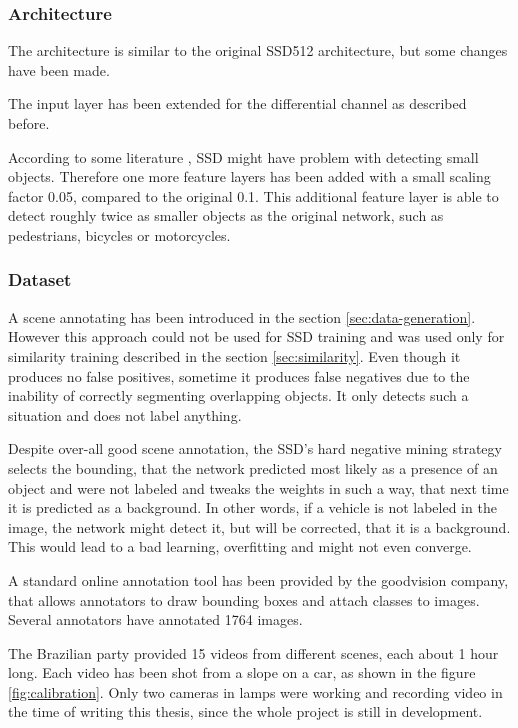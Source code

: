 \documentclass[a4paper,12pt,titlepage, twoside]{article}
\numberwithin{figure}{section}
\begin{document}
\subsubsection{Architecture}
The architecture is similar to the original SSD512 architecture, but some changes have been made. 

The input layer has been extended for the differential channel as described before. 

According to some literature \cite{cao2018feature}, SSD might have problem with detecting small objects. Therefore one more feature layers has been added with a small scaling factor 0.05, compared to the original 0.1. This additional feature layer is able to detect roughly twice as smaller objects as the original network, such as pedestrians, bicycles or motorcycles.

\subsubsection{Dataset}
A scene annotating has been introduced in the section \ref{sec:data-generation}. However this approach could not be used for SSD training and was used only for similarity training described in the section \ref{sec:similarity}. Even though it produces no false positives, sometime it produces false negatives due to the inability of correctly segmenting overlapping objects. It only detects such a situation and does not label anything.

Despite over-all good scene annotation, the SSD's hard negative mining strategy selects the bounding, that the network predicted most likely as a presence of an object and were not labeled and tweaks the weights in such a way, that next time it is predicted as a background. In other words, if a vehicle is not labeled in the image, the network might detect it, but will be corrected, that it is a background. This would lead to a bad learning, overfitting and might not even converge.

A standard online annotation tool has been provided by the goodvision company, that allows annotators to draw bounding boxes and attach classes to images. Several annotators have annotated 1764 images.

The Brazilian party provided 15 videos from different scenes, each about 1 hour long. Each video has been shot from a slope on a car, as shown in the figure \ref{fig:calibration}. Only two cameras in lamps were working and recording video in the time of writing this thesis, since the whole project is still in development. 
\end{document}
